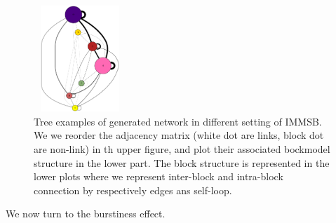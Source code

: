 \begin{figure}[h]
	\endminipage
	\includegraphics[width=3.5cm, height=4cm]{img/M_g_regular/graph_dot}
	\endminipage
	\caption{Tree examples of generated network in different setting of IMMSB. We we reorder the adjacency matrix (white dot are links, block dot are non-link) in th upper figure, and plot their associated bockmodel structure in the lower part. The block structure is represented in the lower plots where we represent inter-block and intra-block connection by respectively edges ans self-loop.  }
	\label{fig:gen_blocks}
\end{figure}


 We now turn to the burstiness effect.
